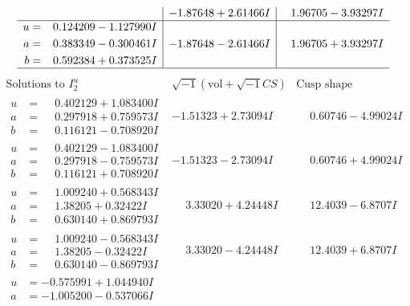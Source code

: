\documentclass[1p]{elsarticle_modified}
\theoremstyle{definition}
\newcommand{\I}{\sqrt{-1}}
\begin{document}
$$\begin{array}{c|c|c}
 & -1.87648 + 2.61466 I & \phantom{-}1.96705 - 3.93297 I \\ \hline\begin{aligned}
u &= \phantom{-}0.124209 - 1.127990 I \\
a &= \phantom{-}0.383349 - 0.300461 I \\
b &= \phantom{-}0.592384 + 0.373525 I\end{aligned}
 & -1.87648 - 2.61466 I & \phantom{-}1.96705 + 3.93297 I\\
 \hline 
 \end{array}$$\newpage$$\begin{array}{c|c|c}  
\text{Solutions to }I^u_{2}& \I (\text{vol} + \sqrt{-1}CS) & \text{Cusp shape}\\
 \hline 
\begin{aligned}
u &= \phantom{-}0.402129 + 1.083400 I \\
a &= \phantom{-}0.297918 + 0.759573 I \\
b &= \phantom{-}0.116121 - 0.708920 I\end{aligned}
 & -1.51323 + 2.73094 I & \phantom{-}0.60746 - 4.99024 I \\ \hline\begin{aligned}
u &= \phantom{-}0.402129 - 1.083400 I \\
a &= \phantom{-}0.297918 - 0.759573 I \\
b &= \phantom{-}0.116121 + 0.708920 I\end{aligned}
 & -1.51323 - 2.73094 I & \phantom{-}0.60746 + 4.99024 I \\ \hline\begin{aligned}
u &= \phantom{-}1.009240 + 0.568343 I \\
a &= \phantom{-}1.38205 + 0.32422 I \\
b &= \phantom{-}0.630140 + 0.869793 I\end{aligned}
 & \phantom{-}3.33020 + 4.24448 I & \phantom{-}12.4039 - 6.8707 I \\ \hline\begin{aligned}
u &= \phantom{-}1.009240 - 0.568343 I \\
a &= \phantom{-}1.38205 - 0.32422 I \\
b &= \phantom{-}0.630140 - 0.869793 I\end{aligned}
 & \phantom{-}3.33020 - 4.24448 I & \phantom{-}12.4039 + 6.8707 I \\ \hline\begin{aligned}
u &= -0.575991 + 1.044940 I \\
a &= -1.005200 - 0.537066 I \\

\end{aligned}
\end{array}$$
\end{document}
